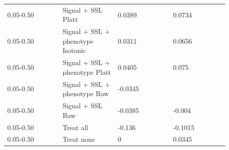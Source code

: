 \documentclass[11pt]{article}
\begin{document}
\begin{landscape}
\begin{longtable}{L{0.225\linewidth} L{0.225\linewidth} L{0.225\linewidth} L{0.225\linewidth}}
0.\allowbreak{}05-\allowbreak{}0.\allowbreak{}50 & Signal + SSL Platt & 0.\allowbreak{}0389 & 0.\allowbreak{}0734 \\
0.\allowbreak{}05-\allowbreak{}0.\allowbreak{}50 & Signal + SSL + phenotype Isotonic & 0.\allowbreak{}0311 & 0.\allowbreak{}0656 \\
0.\allowbreak{}05-\allowbreak{}0.\allowbreak{}50 & Signal + SSL + phenotype Platt & 0.\allowbreak{}0405 & 0.\allowbreak{}075 \\
0.\allowbreak{}05-\allowbreak{}0.\allowbreak{}50 & Signal + SSL + phenotype Raw & -\allowbreak{}0.\allowbreak{}0345 &  \\
0.\allowbreak{}05-\allowbreak{}0.\allowbreak{}50 & Signal + SSL Raw & -\allowbreak{}0.\allowbreak{}0385 & -\allowbreak{}0.\allowbreak{}004 \\
0.\allowbreak{}05-\allowbreak{}0.\allowbreak{}50 & Treat all & -\allowbreak{}0.\allowbreak{}136 & -\allowbreak{}0.\allowbreak{}1015 \\
0.\allowbreak{}05-\allowbreak{}0.\allowbreak{}50 & Treat none & 0 & 0.\allowbreak{}0345 \\
\end{longtable}
\normalsize
\end{landscape}
\end{document}
